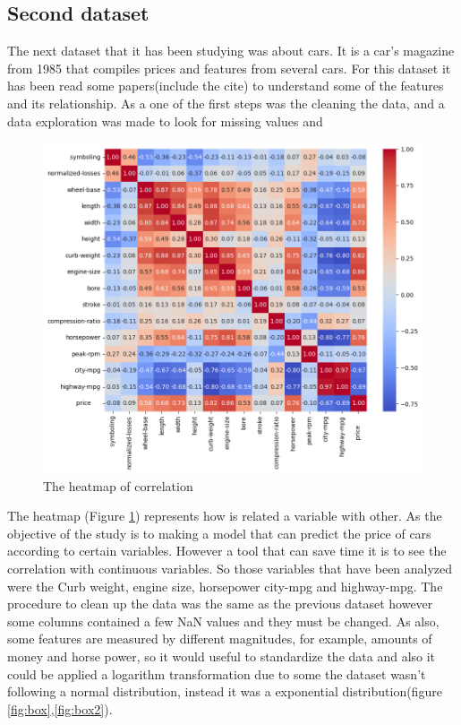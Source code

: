 \documentclass{article}
\begin{document}
\subsection{Second dataset}
The next dataset that it has been studying was about cars. It is a car's magazine from 1985 that compiles prices and features from several cars. 
For this dataset it has been read some papers(include the cite) to understand some of the features and its relationship. 
As a one of the first steps was the cleaning the data, and a data exploration was made to look for missing values and 
\begin{center}
\begin{figure}[H]
  \center
  \includegraphics[width=1.1\textwidth]{heatmap.png}
  \caption{The heatmap of correlation}
  \label{fig:heatmap}
\end{figure}
\end{center}
The heatmap (Figure \ref{fig:heatmap}) represents how is related a variable with other. As the objective of the study is to making a model that can predict the price of cars according to certain variables. 
However a tool that can save time it is to see the correlation with continuous variables. So those variables that have been analyzed were the Curb weight, engine size, horsepower city-mpg and highway-mpg.
The procedure to clean up the data was the same as the previous dataset however some columns contained a few NaN values and they must be changed. As also, some features are measured by different magnitudes, for example, amounts of money and horse power, so it would useful to standardize the data and also it could be applied a logarithm transformation due to some the dataset wasn't following a normal distribution, instead it was a exponential distribution(figure \ref{fig:box},\ref{fig:box2}).
\end{document}
